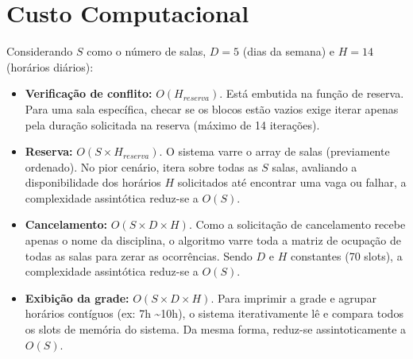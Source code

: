 \documentclass[11pt,a4paper]{article}
\begin{document}
\section*{Custo Computacional}
Considerando $S$ como o número de salas, $D = 5$ (dias da semana) e $H = 14$ (horários diários):

\begin{itemize}
    \item \textbf{Verificação de conflito:} $O(H_{reserva})$. Está embutida na função de reserva. Para uma sala específica, checar se os blocos estão vazios exige iterar apenas pela duração solicitada na reserva (máximo de 14 iterações).
    \item \textbf{Reserva:} $O(S \times H_{reserva})$. O sistema varre o array de salas (previamente ordenado). No pior cenário, itera sobre todas as $S$ salas, avaliando a disponibilidade dos horários $H$ solicitados até encontrar uma vaga ou falhar, a complexidade assintótica reduz-se a $O(S)$.
    \item \textbf{Cancelamento:} $O(S \times D \times H)$. Como a solicitação de cancelamento recebe apenas o nome da disciplina, o algoritmo varre toda a matriz de ocupação de todas as salas para zerar as ocorrências. Sendo $D$ e $H$ constantes (70 slots), a complexidade assintótica reduz-se a $O(S)$.
    \item \textbf{Exibição da grade:} $O(S \times D \times H)$. Para imprimir a grade e agrupar horários contíguos (ex: 7h \textasciitilde 10h), o sistema iterativamente lê e compara todos os slots de memória do sistema. Da mesma forma, reduz-se assintoticamente a $O(S)$.
\end{itemize}
\end{document}
